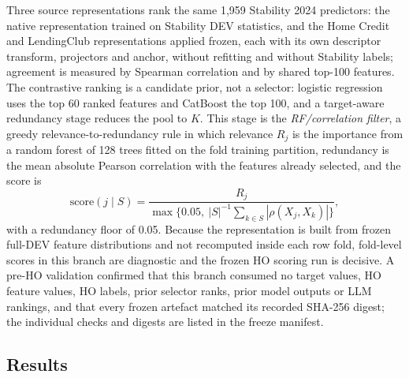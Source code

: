 \documentclass[final,5p,twocolumn]{elsarticle}
\newcommand{\Kfeat}{K}
\begin{document}
Three source representations rank the same 1,959 Stability 2024 predictors: the native representation trained on Stability DEV statistics, and the Home Credit and LendingClub representations applied frozen, each with its own descriptor transform, projectors and anchor, without refitting and without Stability labels; agreement is measured by Spearman correlation \cite{spearman1904} and by shared top-100 features. The contrastive ranking is a candidate prior, not a selector: logistic regression uses the top 60 ranked features and CatBoost the top 100, and a target-aware redundancy stage reduces the pool to $\Kfeat$. This stage is the \emph{RF/correlation filter}, a greedy relevance-to-redundancy rule in which relevance $R_j$ is the importance from a random forest of 128 trees fitted on the fold training partition, redundancy is the mean absolute Pearson correlation with the features already selected, and the score is
\begin{equation}
    \mathrm{score}(j\mid S)=\frac{R_j}{\max\{0.05,\ |S|^{-1}\sum_{k\in S}|\rho(X_j,X_k)|\}} ,
    \label{eq:rf_corr_filter}
\end{equation}
with a redundancy floor of 0.05. Because the representation is built from frozen full-DEV feature distributions and not recomputed inside each row fold, fold-level scores in this branch are diagnostic and the frozen HO scoring run is decisive. A pre-HO validation confirmed that this branch consumed no target values, HO feature values, HO labels, prior selector ranks, prior model outputs or LLM rankings, and that every frozen artefact matched its recorded SHA-256 digest; the individual checks and digests are listed in the freeze manifest.

\subsection{Results}
\label{subsec:clip_results}
\end{document}
